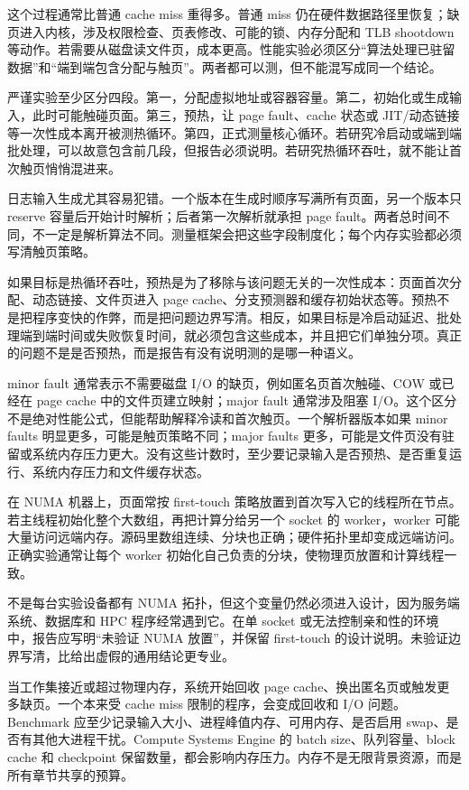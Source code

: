 这个过程通常比普通 cache miss 重得多。普通 miss 仍在硬件数据路径里恢复；缺页进入内核，涉及权限检查、页表修改、可能的锁、内存分配和 TLB shootdown 等动作。若需要从磁盘读文件页，成本更高。性能实验必须区分“算法处理已驻留数据”和“端到端包含分配与触页”。两者都可以测，但不能混写成同一个结论。

严谨实验至少区分四段。第一，分配虚拟地址或容器容量。第二，初始化或生成输入，此时可能触碰页面。第三，预热，让 page fault、cache 状态或 JIT/动态链接等一次性成本离开被测热循环。第四，正式测量核心循环。若研究冷启动或端到端批处理，可以故意包含前几段，但报告必须说明。若研究热循环吞吐，就不能让首次触页悄悄混进来。

日志输入生成尤其容易犯错。一个版本在生成时顺序写满所有页面，另一个版本只 reserve 容量后开始计时解析；后者第一次解析就承担 page fault。两者总时间不同，不一定是解析算法不同。测量框架会把这些字段制度化；每个内存实验都必须写清触页策略。

如果目标是热循环吞吐，预热是为了移除与该问题无关的一次性成本：页面首次分配、动态链接、文件页进入 page cache、分支预测器和缓存初始状态等。预热不是把程序变快的作弊，而是把问题边界写清。相反，如果目标是冷启动延迟、批处理端到端时间或失败恢复时间，就必须包含这些成本，并且把它们单独分项。真正的问题不是是否预热，而是报告有没有说明测的是哪一种语义。

minor fault 通常表示不需要磁盘 I/O 的缺页，例如匿名页首次触碰、COW 或已经在 page cache 中的文件页建立映射；major fault 通常涉及阻塞 I/O。这个区分不是绝对性能公式，但能帮助解释冷读和首次触页。一个解析器版本如果 minor faults 明显更多，可能是触页策略不同；major faults 更多，可能是文件页没有驻留或系统内存压力更大。没有这些计数时，至少要记录输入是否预热、是否重复运行、系统内存压力和文件缓存状态。

在 NUMA 机器上，页面常按 first-touch 策略放置到首次写入它的线程所在节点。若主线程初始化整个大数组，再把计算分给另一个 socket 的 worker，worker 可能大量访问远端内存。源码里数组连续、分块也正确；硬件拓扑里却变成远端访问。正确实验通常让每个 worker 初始化自己负责的分块，使物理页放置和计算线程一致。

不是每台实验设备都有 NUMA 拓扑，但这个变量仍然必须进入设计，因为服务端系统、数据库和 HPC 程序经常遇到它。在单 socket 或无法控制亲和性的环境中，报告应写明“未验证 NUMA 放置”，并保留 first-touch 的设计说明。未验证边界写清，比给出虚假的通用结论更专业。

当工作集接近或超过物理内存，系统开始回收 page cache、换出匿名页或触发更多缺页。一个本来受 cache miss 限制的程序，会变成回收和 I/O 问题。Benchmark 应至少记录输入大小、进程峰值内存、可用内存、是否启用 swap、是否有其他大进程干扰。Compute Systems Engine 的 batch size、队列容量、block cache 和 checkpoint 保留数量，都会影响内存压力。内存不是无限背景资源，而是所有章节共享的预算。

